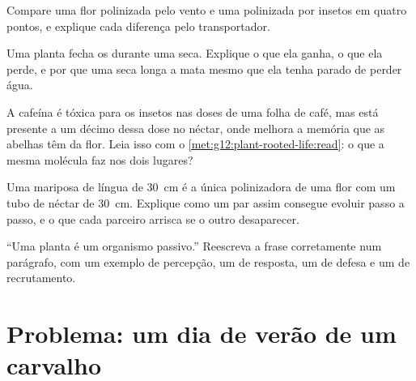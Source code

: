 \begin{exercise}[$\star\star$]\label{exo:g12:plant-rooted-life:11}
Compare uma flor polinizada pelo vento e uma polinizada por insetos em
quatro pontos, e explique cada diferença pelo transportador.
\end{exercise}

\begin{exercise}[$\star\star\star$]\label{exo:g12:plant-rooted-life:12}
Uma planta fecha os  durante uma seca. Explique o que ela
ganha, o que ela perde, e por que uma seca longa a mata mesmo que ela
tenha parado de perder água.
\end{exercise}

\begin{exercise}[$\star\star\star$]\label{exo:g12:plant-rooted-life:13}
A cafeína é tóxica para os insetos nas doses de uma folha de café, mas
está presente a um décimo dessa dose no néctar, onde melhora a memória
que as abelhas têm da flor. Leia isso com o
\cref{met:g12:plant-rooted-life:read}: o que a mesma molécula faz nos
dois lugares?
\end{exercise}

\begin{exercise}[$\star\star\star$]\label{exo:g12:plant-rooted-life:14}
Uma mariposa de língua de \qty{30}{cm} é a única polinizadora de uma
flor com um tubo de néctar de \qty{30}{cm}. Explique como um par assim
consegue evoluir passo a passo, e o que cada parceiro arrisca se o
outro desaparecer.
\end{exercise}

\begin{exercise}[$\star\star\star$]\label{exo:g12:plant-rooted-life:15}
``Uma planta é um organismo passivo.'' Reescreva a frase corretamente
num parágrafo, com um exemplo de percepção, um de resposta, um de
defesa e um de recrutamento.
\end{exercise}

\section{Problema: um dia de verão de um carvalho}

